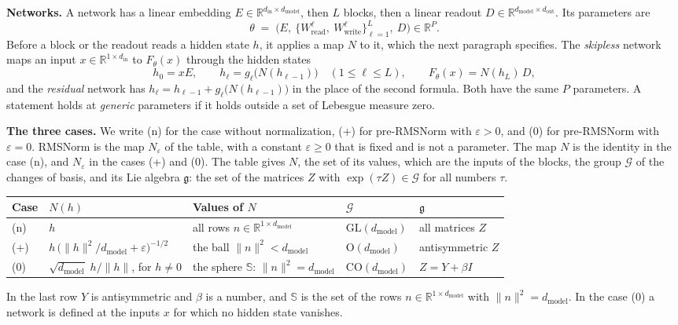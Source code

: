 \documentclass[10pt]{article}
\theoremstyle{definition}
\theoremstyle{remark}
\newcommand{\R}{\mathbb{R}}
\newcommand{\Wread}{W_{\mathrm{read}}}
\newcommand{\Wwrite}{W_{\mathrm{write}}}
\newcommand{\dm}{d_{\mathrm{model}}}
\newcommand{\GL}{\mathrm{GL}}
\newcommand{\Ort}{\mathrm{O}}
\newcommand{\CO}{\mathrm{CO}}
\newcommand{\G}{\mathcal{G}}
\newcommand{\norm}[1]{\lVert #1\rVert}
\newcommand{\para}[1]{\smallskip\noindent\textbf{#1}\hspace{0.5em}}
\begin{document}
\para{Networks.} A network has a linear embedding $E \in \R^{d_{\mathrm{in}}\times\dm}$, then $L$ blocks, then a linear readout $D \in \R^{\dm\times d_{\mathrm{out}}}$. Its parameters are
\[
\theta \;=\; \Big(E,\ \big\{\Wread^{\ell},\ \Wwrite^{\ell}\big\}_{\ell=1}^{L},\ D\Big) \in \R^P .
\]
Before a block or the readout reads a hidden state $h$, it applies a map $N$ to it, which the next paragraph specifies. The \emph{skipless} network maps an input $x \in \R^{1\times d_{\mathrm{in}}}$ to $F_\theta(x)$ through the hidden states
\[
h_0 = xE, \qquad h_\ell = g_\ell\big(N(h_{\ell-1})\big) \quad (1 \le \ell \le L), \qquad F_\theta(x) = N(h_L)\,D ,
\]
and the \emph{residual} network has $h_\ell = h_{\ell-1} + g_\ell\big(N(h_{\ell-1})\big)$ in the place of the second formula. Both have the same $P$ parameters. A statement holds at \emph{generic} parameters if it holds outside a set of Lebesgue measure zero.

\para{The three cases.} We write (n) for the case without normalization, (+) for pre-RMSNorm with $\varepsilon > 0$, and (0) for pre-RMSNorm with $\varepsilon = 0$. RMSNorm is the map $N_\varepsilon$ of the table, with a constant $\varepsilon \ge 0$ that is fixed and is not a parameter. The map $N$ is the identity in the case (n), and $N_\varepsilon$ in the cases (+) and (0). The table gives $N$, the set of its values, which are the inputs of the blocks, the group $\G$ of the changes of basis, and its Lie algebra $\mathfrak g$: the set of the matrices $Z$ with $\exp(\tau Z) \in \G$ for all numbers $\tau$.
\begin{center}\small
\begin{tabular}{@{}lllll@{}}
\toprule
Case & $N(h)$ & Values of $N$ & $\G$ & $\mathfrak g$ \\
\midrule
(n) & $h$ & all rows $n \in \R^{1\times\dm}$ & $\GL(\dm)$ & all matrices $Z$ \\[2pt]
(+) & $h\,\big(\norm{h}^2/\dm + \varepsilon\big)^{-1/2}$ & the ball $\norm{n}^2 < \dm$ & $\Ort(\dm)$ & antisymmetric $Z$ \\[2pt]
(0) & $\sqrt{\dm}\;h/\norm{h}$, for $h \neq 0$ & the sphere $\mathbb S$: $\norm{n}^2 = \dm$ & $\CO(\dm)$ & $Z = Y + \beta I$ \\
\bottomrule
\end{tabular}
\end{center}
In the last row $Y$ is antisymmetric and $\beta$ is a number, and $\mathbb S$ is the set of the rows $n \in \R^{1\times\dm}$ with $\norm{n}^2 = \dm$. In the case (0) a network is defined at the inputs $x$ for which no hidden state vanishes.
\end{document}
